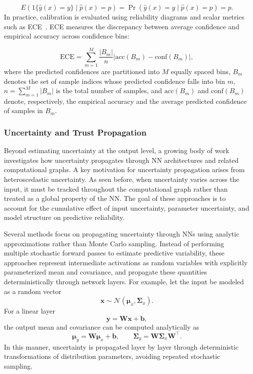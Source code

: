 \[
E(1\{\hat{y}(x)=y\} \mid \hat{p}(x)=p ) = \Pr(\hat{y}(x)=y \mid \hat{p}(x)=p) = p.
\]
In practice, calibration is evaluated using reliability diagrams and scalar metrics such as \ac{ECE}~\cite{guo2017calibrationmodernneuralnetworks,Naeini_Cooper_Hauskrecht_2015}. \ac{ECE} measures the discrepancy between average confidence and empirical accuracy across confidence bins:

\[
\text{ECE} = \sum_{m=1}^{M} \frac{|B_m|}{n} 
\left| \text{acc}(B_m) - \text{conf}(B_m) \right|,
\]
where the predicted confidences are partitioned into $M$ equally spaced bins, $B_m$ denotes the set of sample indices whose predicted confidence falls into bin $m$, $n = \sum_{m=1}^{M} |B_m|$ is the total number of samples, and $\text{acc}(B_m)$ and $\text{conf}(B_m)$ denote, respectively, the empirical accuracy and the average predicted confidence of samples in $B_m$.

\subsubsection{Uncertainty and Trust Propagation}
Beyond estimating uncertainty at the output level, a growing body of work investigates how uncertainty propagates through \ac{NN} architectures and related computational graphs. A key motivation for uncertainty propagation arises from heteroscedastic uncertainty. As seen before, when uncertainty varies across the input, it must be tracked throughout the computational graph rather than treated as a global property of the \ac{NN}. The goal of these approaches is to account for the cumulative effect of input uncertainty, parameter uncertainty, and model structure on predictive reliability.

Several methods focus on propagating uncertainty through \acp{NN} using analytic approximations rather than Monte Carlo sampling. Instead of performing multiple stochastic forward passes to estimate predictive variability, these approaches represent intermediate activations as random variables with explicitly parameterized mean and covariance, and propagate these quantities deterministically through network layers. For example, let the input be modeled as a random vector
\[
\mathbf{x} \sim \mathcal{N}(\boldsymbol{\mu}_x, \mathbf{\Sigma}_x).
\]
For a linear layer
\[
\mathbf{y} = \mathbf{W}\mathbf{x} + \mathbf{b},
\]
the output mean and covariance can be computed analytically as
\[
\boldsymbol{\mu}_y = \mathbf{W}\boldsymbol{\mu}_x + \mathbf{b}, \qquad
\mathbf{\Sigma}_y = \mathbf{W}\mathbf{\Sigma}_x \mathbf{W}^\top.
\]
In this manner, uncertainty is propagated layer by layer through deterministic transformations of distribution parameters, avoiding repeated stochastic sampling.

